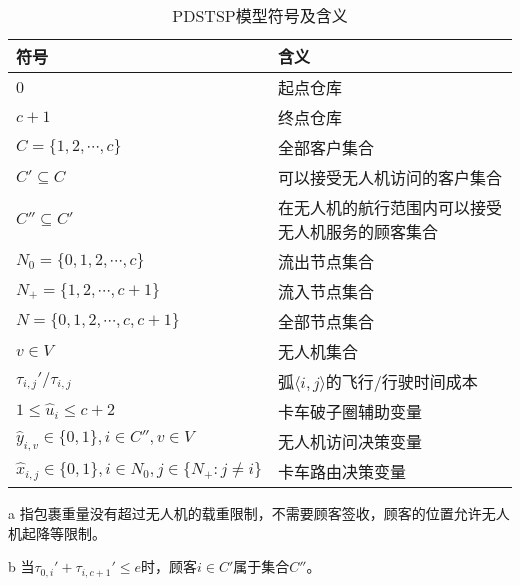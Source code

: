 \begin{table}[!htbp]
    \begin{threeparttable}
    \centering
    \caption{PDSTSP模型符号及含义}
    \label{tab:pdstsp-sign-meaning}
    \begin{tabularx}{\textwidth}{lX}
        \toprule[1pt] %
        符号 & 含义 \\
        \midrule[0.75pt] %
        $0$ & 起点仓库 \\
        $c + 1$ & 终点仓库 \\
        $C=\{1,2,\cdots,c\}$ & 全部客户集合 \\
        $C' \subseteq C$ & 可以接受无人机访问的客户集合\hyperlink{tab:pdstsp-item-1}{\tnote{a}}\\
        $C'' \subseteq C'$ & 在无人机的航行范围内可以接受无人机服务的顾客集合\hyperlink{tab:pdstsp-item-2}{\tnote{b}}\\ 
        $N_0 = \{0,1,2,\cdots,c\}$ & 流出节点集合 \\
        $N_+ = \{1,2,\cdots,c + 1\}$ & 流入节点集合 \\
        $N = \{0,1,2,\cdots,c,c + 1\}$ & 全部节点集合 \\
        $v \in V$ & 无人机集合\\ 
        $\tau_{i,j}'/\tau_{i,j}$ & 弧$\langle i,j\rangle$的飞行/行驶时间成本 \\
        $1 \leq \hat{u}_i \leq c + 2$ & 卡车破子圈辅助变量 \\
        $\hat{y}_{i,v} \in \{0, 1\}, i \in C'', v\in V$ & 无人机访问决策变量\\ 
        $\hat{x}_{i,j} \in \{0, 1\}, i \in N_0, j \in \{N_+:j\neq i\}$ & 卡车路由决策变量\\ 
        \bottomrule[1pt] %
    \end{tabularx}
    \begin{tablenotes}
        \footnotesize %
        \item[a] \hypertarget{tab:pdstsp-item-1}{}指包裹重量没有超过无人机的载重限制，不需要顾客签收，顾客的位置允许无人机起降等限制。
        \item[b] \hypertarget{tab:pdstsp-item-2}{}当$\tau_{0,i}'+\tau_{i,c+1}'\leq e$时，顾客$i \in C'$属于集合$C''$。
    \end{tablenotes}
    \end{threeparttable}
\end{table}
\hyperlink{tab:fstsp-item-4}{}


